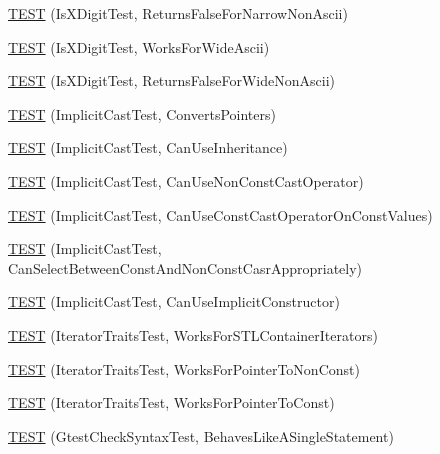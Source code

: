 \begin{DoxyCompactItemize}
\item 
\mbox{\hyperlink{namespacetesting_1_1internal_a7cd9d67d4164d2aeb4ceb3ed253c7d2d}{T\+E\+ST}} (Is\+X\+Digit\+Test, Returns\+False\+For\+Narrow\+Non\+Ascii)
\item 
\mbox{\hyperlink{namespacetesting_1_1internal_af76bca685fddffc0ecda1464b1b6a0a4}{T\+E\+ST}} (Is\+X\+Digit\+Test, Works\+For\+Wide\+Ascii)
\item 
\mbox{\hyperlink{namespacetesting_1_1internal_a771232ed3801fa49cbd4bbe11b318fe3}{T\+E\+ST}} (Is\+X\+Digit\+Test, Returns\+False\+For\+Wide\+Non\+Ascii)
\item 
\mbox{\hyperlink{namespacetesting_1_1internal_a5d2ec1128c80363b06070f403f682490}{T\+E\+ST}} (Implicit\+Cast\+Test, Converts\+Pointers)
\item 
\mbox{\hyperlink{namespacetesting_1_1internal_a1b304dcd3ac71095f2e7d9e9b43c4755}{T\+E\+ST}} (Implicit\+Cast\+Test, Can\+Use\+Inheritance)
\item 
\mbox{\hyperlink{namespacetesting_1_1internal_a8554484c7c0ea536bc393c254490aaff}{T\+E\+ST}} (Implicit\+Cast\+Test, Can\+Use\+Non\+Const\+Cast\+Operator)
\item 
\mbox{\hyperlink{namespacetesting_1_1internal_af7f631f9fbde27b19a65d50fc29e1420}{T\+E\+ST}} (Implicit\+Cast\+Test, Can\+Use\+Const\+Cast\+Operator\+On\+Const\+Values)
\item 
\mbox{\hyperlink{namespacetesting_1_1internal_a62a3b62658f9d47733cb7b5c8f69b2ad}{T\+E\+ST}} (Implicit\+Cast\+Test, Can\+Select\+Between\+Const\+And\+Non\+Const\+Casr\+Appropriately)
\item 
\mbox{\hyperlink{namespacetesting_1_1internal_ad5c2cf37cc5aa78744012255cae78f9b}{T\+E\+ST}} (Implicit\+Cast\+Test, Can\+Use\+Implicit\+Constructor)
\item 
\mbox{\hyperlink{namespacetesting_1_1internal_abd56ca990c5b8c1aea44d15028a74f33}{T\+E\+ST}} (Iterator\+Traits\+Test, Works\+For\+S\+T\+L\+Container\+Iterators)
\item 
\mbox{\hyperlink{namespacetesting_1_1internal_a642234d85836450bb8795cf0a8a9f908}{T\+E\+ST}} (Iterator\+Traits\+Test, Works\+For\+Pointer\+To\+Non\+Const)
\item 
\mbox{\hyperlink{namespacetesting_1_1internal_afc0e95a0472d243967fd4720c681c478}{T\+E\+ST}} (Iterator\+Traits\+Test, Works\+For\+Pointer\+To\+Const)
\item 
\mbox{\hyperlink{namespacetesting_1_1internal_a26d00130a017a66d0d60dc5a02a13d25}{T\+E\+ST}} (Gtest\+Check\+Syntax\+Test, Behaves\+Like\+A\+Single\+Statement)
\item 

\end{DoxyCompactItemize}
